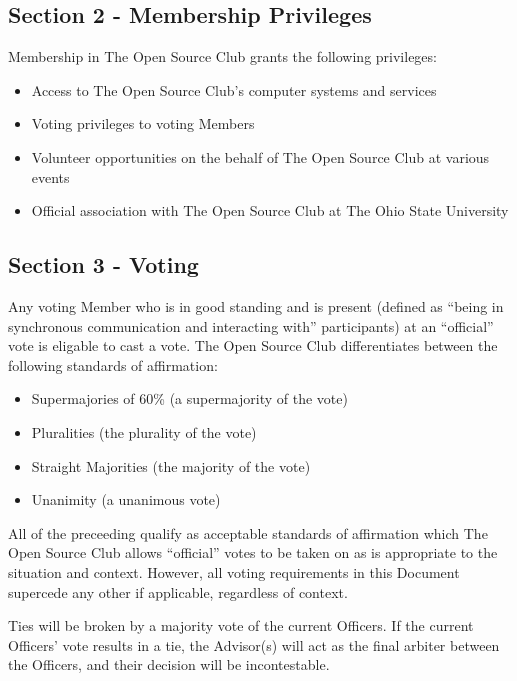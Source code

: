 \documentclass{article}
\begin{document}
	\subsection{Section 2 - Membership Privileges}

  Membership in The Open Source Club grants the following privileges:

  \begin{itemize}
    \item Access to The Open Source Club's computer systems and services
    \item Voting privileges to voting Members
    \item Volunteer opportunities on the behalf of The Open Source Club at various events
    \item Official association with The Open Source Club at The Ohio State University
  \end{itemize}

	\subsection{Section 3 - Voting}

  Any voting Member who is in good standing and is present (defined as ``being in synchronous communication and interacting with'' participants) at an ``official'' vote is eligable to cast a vote. The Open Source Club differentiates between the following standards of affirmation:

  \begin{itemize}
    \item Supermajories of 60\% (a supermajority of the vote)
    \item Pluralities (the plurality of the vote)
    \item Straight Majorities (the majority of the vote)
    \item Unanimity (a unanimous vote)
  \end{itemize}

  All of the preceeding qualify as acceptable standards of affirmation which The Open Source Club allows ``official'' votes to be taken on as is appropriate to the situation and context. However, all voting requirements in this Document supercede any other if applicable, regardless of context.

  Ties will be broken by a majority vote of the current Officers. If the current Officers' vote results in a tie, the Advisor(s) will act as the final arbiter between the Officers, and their decision will be incontestable.
\end{document}
